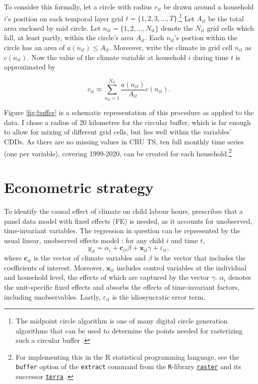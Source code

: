 \documentclass[a4paper,12pt]{article}
\theoremstyle{plain}
\theoremstyle{definition}
\theoremstyle{definition}
\theoremstyle{definition}
\theoremstyle{definition}
\begin{document}
To consider this formally, let a circle with radius $r_{it}$ be drawn around a household $i$'s position on each temporal layer grid $t = \{1, 2, 3,\dots, T\}$.\footnote{The midpoint circle algorithm is one of many digital circle generation algorithms that can be used to determine the points needed for rasterizing such a circular buffer \citep[see, e.g.,][]{barrera2016}.} Let $A_{it}$ be the total area enclosed by said circle. Let $n_{it} =\{1,2,\dots,N_{it}\}$ denote the $N_{it}$ grid cells which fall, at least partly, within the circle's area $A_{it}$. Each $n_{it}$'s portion within the circle has an area of $a(n_{it})\leq A_{it}$. Moreover, write the climate in grid cell $n_{it}$ as $c(n_{it})$. Now the value of the climate variable at household $i$ during time $t$ is approximated by

\begin{equation}
    c_{it}\approx \sum_{n_{it}=1}^{N_{it}}\frac{a(n_{it})}{A_{it}} c(n_{it}).
\end{equation}


Figure \ref{fig:buffer} is a schematic representation of this procedure as applied to the data. I chose a radius of 20 kilometres for the circular buffer, which is far enough to allow for mixing of different grid cells, but lies well within the variables' CDDs. As there are no missing values in CRU TS, ten full monthly time series (one per variable), covering 1999-2020, can be created for each household.\footnote{For implementing this in the R statistical programming language, see the \texttt{buffer} option of the \texttt{extract} command from the \texttt{R}-library \href{https://cran.r-project.org/web/packages/raster}{\texttt{raster}} \citep{hijmans2020} and its successor \href{https://cran.r-project.org/web/packages/terra}{\texttt{terra}} \citep{hijmans2021}.}

\section{Econometric strategy}
\label{sec:empirical_strategy}

To identify the causal effect of climate on child labour hours, \citet{Hsiang2016a} prescribes that a panel data model with fixed effects (FE) is needed, as it accounts for unobserved, time-invariant variables. The regression in question can be represented by the usual linear, unobserved effects model \citep[see e.g.,][]{wooldridge2010}: for any child $i$ and time $t$,
\begin{equation}
\label{eq:linear_FE}
    y_{it} = \alpha_i + \mathbf{c}_{i\tau}\beta + \mathbf{x}_{it}\gamma + \varepsilon_{it},
\end{equation}
where $\mathbf{c}_{it}$ is the vector of climate variables and $\beta$ is the vector that includes the coefficients of interest. Moreover, $\mathbf{x}_{it}$ includes control variables at the individual and household level, the effects of which are captured by the vector $\gamma$. $\alpha_i$ denotes the unit-specific fixed effects and absorbs the effects of time-invariant factors, including unobservables. Lastly, $\varepsilon_{it}$ is the idiosyncratic error term.
\end{document}

